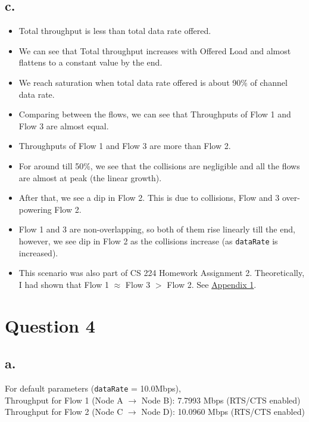 \documentclass[11pt, fleqn]{article}
\begin{document}
\subsection*{c.}

\begin{itemize}
    \item Total throughput is less than total data rate offered.
    \item We can see that Total throughput increases with Offered Load and almost flattens to a constant value by the end.
    \item We reach saturation when total data rate offered is about 90\% of channel data rate.
    \item Comparing between the flows, we can see that Throughputs of Flow 1 and Flow 3 are almost equal.
    \item Throughputs of Flow 1 and Flow 3 are more than Flow 2.
    \item For around till 50\%, we see that the collisions are negligible and all the flows are almost at peak (the linear growth).
    \item After that, we see a dip in Flow 2. This is due to collisions, Flow and 3 over-powering Flow 2.
    \item Flow 1 and 3 are non-overlapping, so both of them rise linearly till the end, however, we see dip in Flow 2 as the collisions increase (as \texttt{dataRate} is increased).
    \item This scenario was also part of CS 224 Homework Assignment 2. Theoretically, I had shown that Flow 1 $\approx$ Flow 3 $>$ Flow 2.
    See \hyperref[Appendix 1]{Appendix 1}.
\end{itemize}

\newpage 
\section*{Question 4}
\setcounter{equation}{0}

\subsection*{a.}

For default parameters (\texttt{dataRate} = 10.0Mbps),\\

Throughput for Flow 1 (Node A $\rightarrow$ Node B): 7.7993 Mbps (RTS/CTS enabled) \\
Throughput for Flow 2 (Node C $\rightarrow$ Node D): 10.0960 Mbps (RTS/CTS enabled) \\
\end{document}
